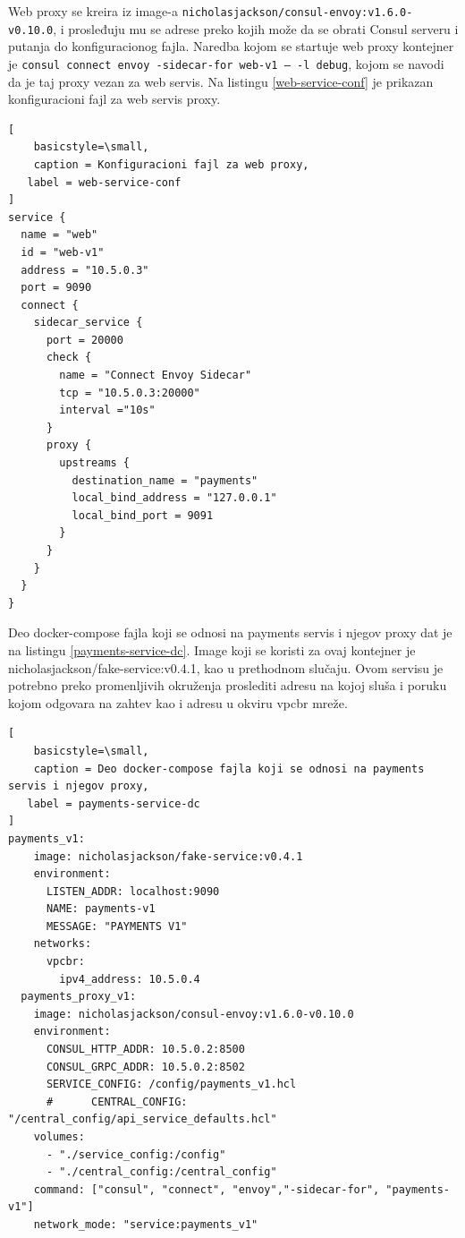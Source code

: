 \documentclass[a4paper,12pt]{report}
\begin{document}
Web proxy se kreira iz image-a \texttt{nicholasjackson/consul-envoy:v1.6.0-v0.10.0}, i prosleđuju mu se adrese preko kojih može da se obrati Consul serveru i putanja do konfiguracionog fajla. Naredba kojom se startuje web proxy kontejner je \texttt{consul connect envoy -sidecar-for web-v1 -- -l debug}, kojom se navodi da je taj proxy vezan za web servis. Na listingu \ref{web-service-conf} je prikazan konfiguracioni fajl za web servis proxy. \newline

\begin{center}
\begin{lstlisting}[
    basicstyle=\small,
    caption = Konfiguracioni fajl za web proxy, 
   label = web-service-conf
]
service {
  name = "web"
  id = "web-v1"
  address = "10.5.0.3"
  port = 9090
  connect { 
    sidecar_service {
      port = 20000
      check {
        name = "Connect Envoy Sidecar"
        tcp = "10.5.0.3:20000"
        interval ="10s"
      }
      proxy {
        upstreams {
          destination_name = "payments"
          local_bind_address = "127.0.0.1"
          local_bind_port = 9091
        }
      }
    }  
  }
}
\end{lstlisting}
\end{center}





Deo docker-compose fajla koji se odnosi na payments servis i njegov proxy dat je na listingu \ref{payments-service-dc}. Image koji se koristi za ovaj kontejner je nicholasjackson/fake-service:v0.4.1, kao u prethodnom slučaju. Ovom servisu je potrebno preko promenljivih okruženja proslediti adresu na kojoj sluša i poruku kojom odgovara na zahtev kao i adresu u okviru vpcbr mreže. \newline

\begin{lstlisting}[
    basicstyle=\small,
    caption = Deo docker-compose fajla koji se odnosi na payments servis i njegov proxy, 
   label = payments-service-dc
]
payments_v1:
    image: nicholasjackson/fake-service:v0.4.1
    environment:
      LISTEN_ADDR: localhost:9090
      NAME: payments-v1
      MESSAGE: "PAYMENTS V1"
    networks:
      vpcbr:
        ipv4_address: 10.5.0.4
  payments_proxy_v1:
    image: nicholasjackson/consul-envoy:v1.6.0-v0.10.0
    environment:
      CONSUL_HTTP_ADDR: 10.5.0.2:8500
      CONSUL_GRPC_ADDR: 10.5.0.2:8502
      SERVICE_CONFIG: /config/payments_v1.hcl
      #      CENTRAL_CONFIG: "/central_config/api_service_defaults.hcl"
    volumes:
      - "./service_config:/config"
      - "./central_config:/central_config"
    command: ["consul", "connect", "envoy","-sidecar-for", "payments-v1"]
    network_mode: "service:payments_v1"
\end{lstlisting}
\end{document}
